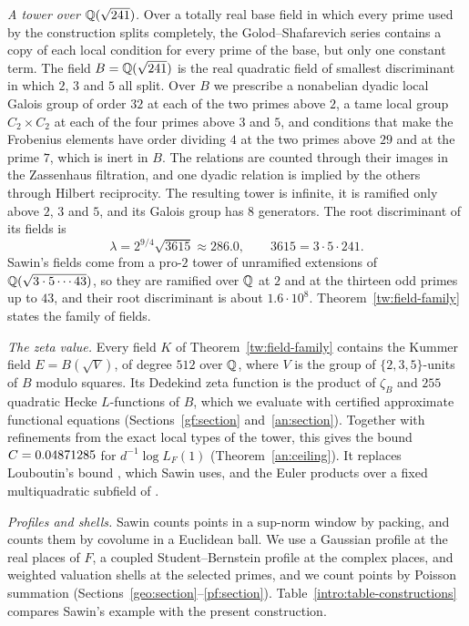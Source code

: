 \emph{A tower over $\mathbb Q(\sqrt{241})$.} Over a totally real base field in
which every prime used by the construction splits completely, the
Golod--Shafarevich series contains a copy of each local condition for
every prime of the base, but only one constant term. The field
$B=\mathbb Q(\sqrt{241})$ is the real quadratic field of smallest discriminant
in which $2$, $3$ and $5$ all split. Over $B$ we prescribe a nonabelian
dyadic local Galois group of order $32$ at each of the two primes above
$2$, a tame local group $C_2\times C_2$ at each of the four primes above
$3$ and $5$, and conditions that make the Frobenius elements have order
dividing $4$ at the two primes above $29$ and at the prime $7$, which is
inert in $B$. The relations are counted through their images in the
Zassenhaus filtration, and one dyadic relation is implied by the others
through Hilbert reciprocity. The resulting tower is infinite, it is
ramified only above $2$, $3$ and $5$, and its Galois group has $8$
generators. The root discriminant of its fields is
\[
 \lambda=2^{9/4}\sqrt{3615}\approx286.0,
 \qquad 3615=3\cdot5\cdot241.
\]
Sawin's fields come from a pro-$2$ tower of unramified extensions of
$\mathbb Q(\sqrt{3\cdot5\cdots43})$, so they are ramified over $\mathbb Q$ at $2$ and at
the thirteen odd primes up to $43$, and their root discriminant is about
$1.6\cdot10^8$. Theorem~\ref{tw:field-family}
states the family of fields.

\emph{The zeta value.} Every field $K$ of Theorem~\ref{tw:field-family}
contains the Kummer field $E=B(\sqrt V)$, of degree $512$ over $\mathbb Q$,
where $V$ is the group of $\{2,3,5\}$-units of $B$ modulo squares. Its
Dedekind zeta function is the product of $\zeta_B$ and $255$ quadratic
Hecke $L$-functions of $B$, which we evaluate with certified approximate
functional equations (Sections~\ref{gf:section} and~\ref{an:section}).
Together with refinements from the exact local types of the tower, this
gives the bound $C=0.04871285$ for $d^{-1}\log L_F(1)$
(Theorem~\ref{an:ceiling}). It replaces Louboutin's bound
\cite{Louboutin2000}, which Sawin uses, and the Euler products over a
fixed multiquadratic subfield of \cite{Naslund0358}.

\emph{Profiles and shells.} Sawin counts points in a sup-norm window by
packing, and \cite{Naslund0358} counts them by covolume in a Euclidean
ball. We use a Gaussian profile at the real places of $F$, a coupled
Student--Bernstein profile at the complex places, and weighted valuation
shells at the selected primes, and we count points by Poisson summation
(Sections~\ref{geo:section}--\ref{pf:section}).
Table~\ref{intro:table-constructions} compares Sawin's example with the
present construction.

